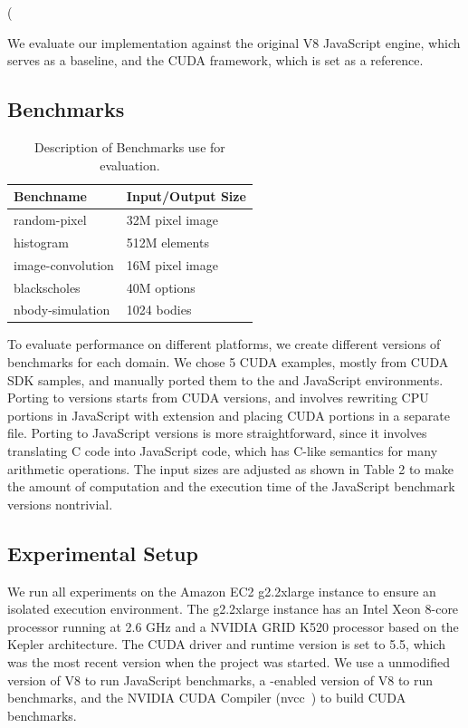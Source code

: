 (

We evaluate our \name implementation against the original V8 JavaScript
engine, which serves as a baseline, and the CUDA framework, which is set as a
reference.

\subsection{Benchmarks}
\begin{table}
	\begin{center}
		\begin{tabular}{| l | l |}
			\hline
			Benchname & Input/Output Size \\
			\hline
			random-pixel & 32M pixel image \\
			\hline
			histogram & 512M elements \\
			\hline
			image-convolution & 16M pixel image \\
			\hline
			blackscholes & 40M options \\
			\hline
			nbody-simulation & 1024 bodies \\
			\hline
		\end{tabular}
	\end{center}
	\caption{Description of Benchmarks use for evaluation.}
	\label{benchmark-table}
\end{table}

To evaluate performance on different platforms, we create different versions of
benchmarks for each domain. We chose 5 CUDA examples, mostly from CUDA SDK
samples, and manually ported them to the \name and JavaScript environments.
Porting to \name versions starts from CUDA versions, and involves rewriting CPU
portions in JavaScript with \name extension and placing CUDA portions in a
separate file. Porting to JavaScript versions is more straightforward, since it
involves translating C code into JavaScript code, which has C-like semantics
for many arithmetic operations.  The input sizes are adjusted as shown in Table
2 to make the amount of computation and the execution time of the JavaScript
benchmark versions nontrivial.

\subsection{Experimental Setup} We run all experiments on the Amazon EC2
\cite{amazonEC2} g2.2xlarge instance to ensure an isolated execution
environment. The g2.2xlarge instance has an Intel Xeon 8-core processor running
at 2.6 GHz and a NVIDIA GRID K520 processor based on the Kepler architecture.
The CUDA driver and runtime version is set to 5.5, which was the most recent
version when the project was started. We use a unmodified version of V8 to run JavaScript benchmarks, a \name-enabled version of V8 to run \name benchmarks, and the NVIDIA CUDA Compiler (nvcc~\cite{nvcc}) to build CUDA benchmarks.

